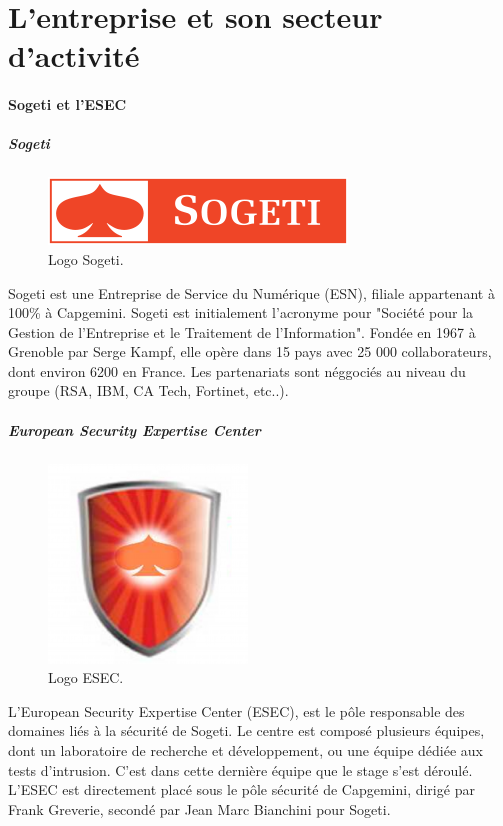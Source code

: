 \section*{L'entreprise et son secteur d'activité}
\paragraph{Sogeti et l'ESEC}
\subparagraph{Sogeti}
\begin{figure}[h]
    \centering
    \includegraphics[scale=0.7]{images/sogeti.png}
    \caption{Logo Sogeti.}
\end{figure}
Sogeti est une Entreprise de Service du Numérique (ESN), filiale appartenant
à 100\% à Capgemini. Sogeti est initialement l'acronyme pour "Société pour la Gestion de
l'Entreprise et le Traitement de l'Information". Fondée en 1967 à Grenoble par Serge Kampf, elle opère
dans 15 pays avec 25 000 collaborateurs, dont environ 6200 en France. Les partenariats sont néggociés au niveau
du groupe (RSA, IBM, CA Tech, Fortinet, etc..).

\subparagraph{European Security Expertise Center}
\begin{figure}[h]
    \centering
    \includegraphics[scale=0.4]{images/esec.png}
    \caption{Logo ESEC.}
\end{figure}
L'European Security Expertise Center (ESEC), est le pôle responsable des domaines
liés à la sécurité de Sogeti. Le centre est composé plusieurs équipes, dont un
laboratoire de recherche et développement, ou une équipe dédiée aux tests d'intrusion.
C'est dans cette dernière équipe que le stage s'est déroulé.
L'ESEC est directement placé sous le pôle sécurité de Capgemini, dirigé par Frank
Greverie, secondé par Jean Marc Bianchini pour Sogeti.

